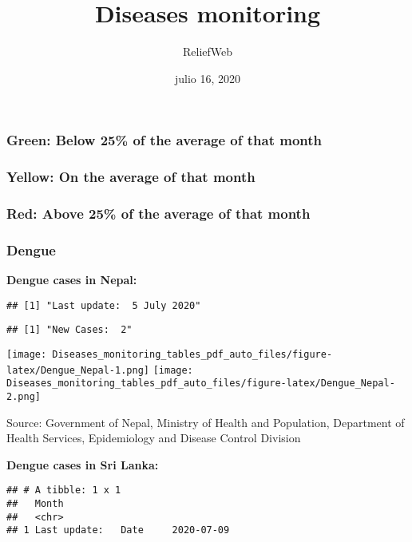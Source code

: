 \documentclass[]{article}
\title{Diseases monitoring}
\author{ReliefWeb}
\date{julio 16, 2020}
\begin{document}
\maketitle

\hypertarget{green-below-25-of-the-average-of-that-month}{%
\subsubsection{Green: Below 25\% of the average of that
month}\label{green-below-25-of-the-average-of-that-month}}

\hypertarget{yellow-on-the-average-of-that-month}{%
\subsubsection{Yellow: On the average of that
month}\label{yellow-on-the-average-of-that-month}}

\hypertarget{red-above-25-of-the-average-of-that-month}{%
\subsubsection{Red: Above 25\% of the average of that
month}\label{red-above-25-of-the-average-of-that-month}}

\pagebreak

\hypertarget{dengue}{%
\subsubsection{Dengue}\label{dengue}}

\textbf{Dengue cases in Nepal:}

\begin{verbatim}
## [1] "Last update:  5 July 2020"
\end{verbatim}

\begin{verbatim}
## [1] "New Cases:  2"
\end{verbatim}

\texttt{[image: Diseases\_monitoring\_tables\_pdf\_auto\_files/figure-latex/Dengue\_Nepal-1.png]}
\texttt{[image: Diseases\_monitoring\_tables\_pdf\_auto\_files/figure-latex/Dengue\_Nepal-2.png]}

Source: Government of Nepal, Ministry of Health and Population,
Department of Health Services, Epidemiology and Disease Control Division

\pagebreak

\textbf{Dengue cases in Sri Lanka:}

\begin{verbatim}
## # A tibble: 1 x 1
##   Month                             
##   <chr>                             
## 1 Last update:   Date     2020-07-09
\end{verbatim}
\end{document}
